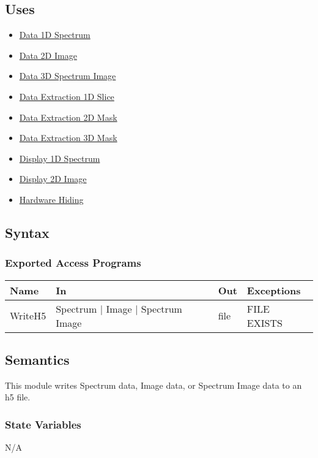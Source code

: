 \documentclass[12pt, titlepage]{article}
\begin{document}
\subsection{Uses}
\begin{itemize}
    \item \hyperref[Mod:Spectrum]{Data 1D Spectrum}
    \item \hyperref[Mod:Image]{Data 2D Image}
    \item \hyperref[Mod:SI]{Data 3D Spectrum Image}
    \item \hyperref[Mod:Slice1D]{Data Extraction 1D Slice}
    \item \hyperref[Mod:Mask2D]{Data Extraction 2D Mask}
    \item \hyperref[Mod:Mask3D]{Data Extraction 3D Mask}
    \item \hyperref[Mod:Disp1D]{Display 1D Spectrum}
    \item \hyperref[Mod:Disp2D]{Display 2D Image}
    \item \hyperref[Mod:HH]{Hardware Hiding}
\end{itemize}

\subsection{Syntax}

\subsubsection{Exported Access Programs}

\begin{center}
    \begin{tabular}{p{2cm} p{4cm} p{2cm} p{4cm}}
        \hline
        \textbf{Name} & \textbf{In} & \textbf{Out} & \textbf{Exceptions} \\
        \hline
        WriteH5 & Spectrum $|$ Image $|$ Spectrum Image & file & FILE EXISTS \\
        \hline
    \end{tabular}
\end{center}

\subsection{Semantics}
This module writes Spectrum data, Image data, or Spectrum Image data to an h5
file.

\subsubsection{State Variables}
N/A
\end{document}
